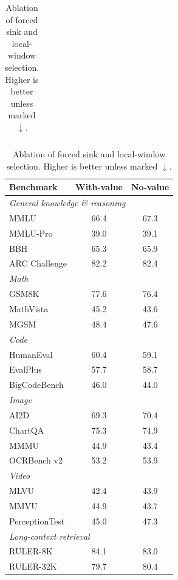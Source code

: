\documentclass{llmxive}
\begin{document}
\begin{table}[!htb]
\begin{minipage}[t]{0.48\textwidth}
\begin{tabular}{l c c}
\bottomrule
\end{tabular}
\end{minipage}\hfill
\begin{minipage}[t]{0.46\textwidth}
\centering
\caption{Continued pre-training ablation of the Index Branch value head.}
\label{tab:idxval-ablation}
\small
\begin{tabular}{l c c}
\toprule
Benchmark & With-value & No-value \\
\midrule
\multicolumn{3}{l}{\textit{General knowledge \& reasoning}} \\
MMLU                                & 66.4 & 67.3 \\
MMLU-Pro                            & 39.0 & 39.1 \\
BBH                                 & 65.3 & 65.9 \\
ARC Challenge                       & 82.2 & 82.4 \\
\midrule
\multicolumn{3}{l}{\textit{Math}} \\
GSM8K                               & 77.6 & 76.4 \\
MathVista                           & 45.2  & 43.6  \\
MGSM                                & 48.4 & 47.6 \\
\midrule
\multicolumn{3}{l}{\textit{Code}} \\
HumanEval                           & 60.4 & 59.1 \\
EvalPlus                            & 57.7 & 58.7 \\
BigCodeBench                        & 46.0 & 44.0 \\
\midrule
\multicolumn{3}{l}{\textit{Image}} \\
AI2D                                & 69.3 & 70.4 \\
ChartQA                             & 75.3 & 74.9 \\
MMMU                                & 44.9 & 43.4 \\
OCRBench v2                         & 53.2 & 53.9 \\
\midrule
\multicolumn{3}{l}{\textit{Video}} \\
MLVU                                & 42.4 & 43.9 \\
MMVU                                & 44.9  & 43.7  \\
PerceptionTest                      & 45.0 & 47.3 \\
\midrule
\multicolumn{3}{l}{\textit{Long-context retrieval}} \\
RULER-8K                            & 84.1 & 83.0 \\
RULER-32K                           & 79.7 & 80.4 \\
\bottomrule
\end{tabular}
\end{minipage}
\caption{Ablation of forced sink and local-window selection. Higher is better unless marked $\downarrow$.}
\label{tab:forced-sink-local}
\end{table}
\end{document}
